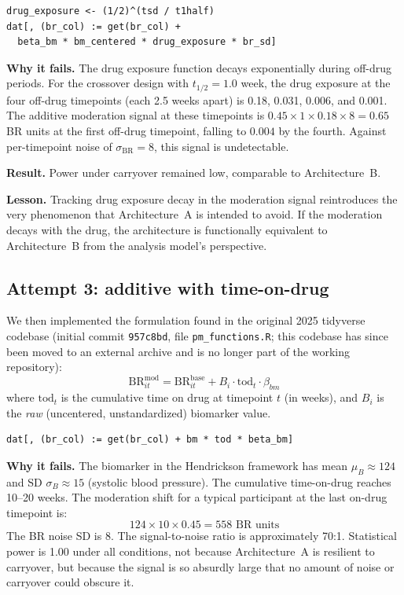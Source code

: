 \documentclass[11pt]{article}
\begin{document}
\begin{lstlisting}
drug_exposure <- (1/2)^(tsd / t1half)
dat[, (br_col) := get(br_col) +
  beta_bm * bm_centered * drug_exposure * br_sd]
\end{lstlisting}

\textbf{Why it fails.} The drug exposure function decays
exponentially during off-drug periods. For the crossover
design with $t_{1/2} = 1.0$ week, the drug exposure at the
four off-drug timepoints (each 2.5 weeks apart) is 0.18,
0.031, 0.006, and 0.001. The additive moderation signal at
these timepoints is $0.45 \times 1 \times 0.18 \times 8 =
0.65$ BR units at the first off-drug timepoint, falling to
$0.004$ by the fourth. Against per-timepoint noise of
$\sigma_{\text{BR}} = 8$, this signal is undetectable.

\textbf{Result.} Power under carryover remained low,
comparable to Architecture~B.

\textbf{Lesson.} Tracking drug exposure decay in the
moderation signal reintroduces the very phenomenon that
Architecture~A is intended to avoid. If the moderation
decays with the drug, the architecture is functionally
equivalent to Architecture~B from the analysis model's
perspective.

\subsection{Attempt 3: additive with time-on-drug}

We then implemented the formulation found in the original
2025 tidyverse codebase (initial commit \texttt{957c8bd},
file \texttt{pm\_functions.R}; this codebase has since been
moved to an external archive and is no longer part of the
working repository):
%
\begin{equation}
  \text{BR}_{it}^{\text{mod}} = \text{BR}_{it}^{\text{base}}
  + B_i \cdot \text{tod}_t \cdot \beta_{bm}
\end{equation}
%
where $\text{tod}_t$ is the cumulative time on drug at
timepoint $t$ (in weeks), and $B_i$ is the \emph{raw}
(uncentered, unstandardized) biomarker value.

\begin{lstlisting}
dat[, (br_col) := get(br_col) + bm * tod * beta_bm]
\end{lstlisting}

\textbf{Why it fails.} The biomarker in the Hendrickson
framework has mean $\mu_B \approx 124$ and SD
$\sigma_B \approx 15$ (systolic blood pressure). The
cumulative time-on-drug reaches 10--20 weeks. The moderation
shift for a typical participant at the last on-drug timepoint
is:
%
\begin{equation}
  124 \times 10 \times 0.45 = 558 \text{ BR units}
\end{equation}
%
The BR noise SD is 8. The signal-to-noise ratio is
approximately 70:1. Statistical power is 1.00 under all
conditions, not because Architecture~A is resilient to
carryover, but because the signal is so absurdly large that
no amount of noise or carryover could obscure it.
\end{document}

